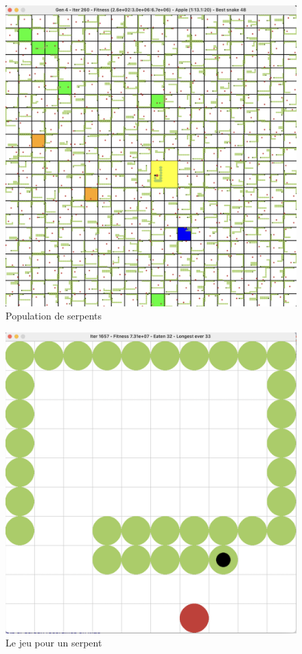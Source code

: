 \documentclass[10pt]{beamer}
\begin{document}
\begin{frame}
\begin{columns}[T]
\begin{column}{0.26\textwidth}
\begin{figure}
  \includegraphics[width=1\textwidth]{snake_population.png}
  \vspace{-0.7cm}
  \caption*{\tiny Population de serpents}
  \end{figure}

  \begin{figure}
  \centering
  \vspace{-0.6cm}
  \includegraphics[width=1\textwidth]{snake_game.png}
  \vspace{-0.7cm}
  \caption*{\tiny Le jeu pour un serpent}
  \end{figure}


\end{column}
\end{columns}
\end{frame}
\end{document}
